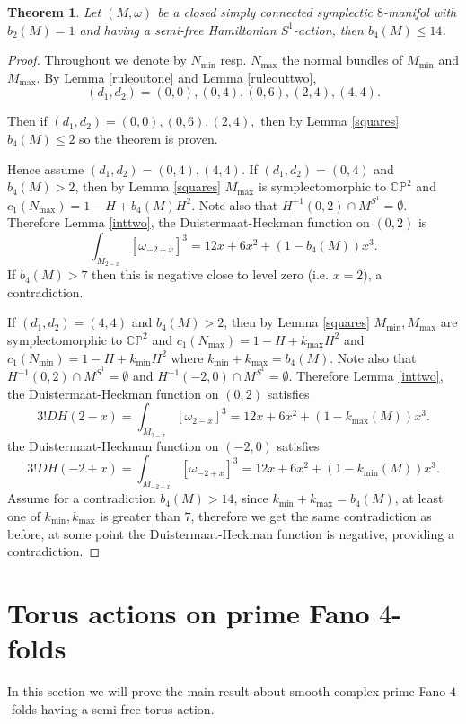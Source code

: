 \documentclass[12pt]{article}
\newtheorem{theorem}{Theorem}[section]
\begin{document}
\begin{theorem} \label{bfourbound}
Let $(M,\omega)$ be a closed  simply connected symplectic $8$-manifol with $b_{2}(M)=1$ and having a semi-free Hamiltonian $S^1$-action, then $b_{4}(M) \leq 14$.
\end{theorem}
\begin{proof}
Throughout we denote by $N_{\min}$ resp. $N_{\max}$ the normal bundles of $M_{\min}$ and $M_{\max}$. By Lemma \ref{ruleoutone} and Lemma \ref{ruleouttwo}, $$(d_1,d_2) = (0,0),(0,4),(0,6),(2,4),(4,4).$$

Then if $(d_1,d_2) =  (0,0),(0,6),(2,4),$ then by Lemma \ref{squares} $b_{4}(M) \leq 2$ so the theorem is proven.

Hence assume $(d_1,d_2) = (0,4),(4,4).$ If $(d_1,d_2) = (0,4)$ and $b_{4}(M) > 2$, then by Lemma \ref{squares} $M_{\max}$ is symplectomorphic to $\mathbb{CP}^2$ and $c_{1}(N_{\max}) = 1 -H + b_{4}(M)H^2$. Note also that $H^{-1}(0,2) \cap M^{S^1} = \emptyset$. Therefore Lemma \ref{inttwo}, the Duistermaat-Heckman function on $(0,2)$ is  $$\int_{M_{2-x}} [\omega_{-2+x}]^3 = 12x + 6x^2 +(1 -b_{4}(M))x^3.$$ If $b_{4}(M)>7$ then this is negative close to level zero (i.e. $x=2$), a contradiction.


If $(d_1,d_2) = (4,4)$ and $b_{4}(M) > 2$, then by Lemma \ref{squares} $M_{\min},M_{\max}$ are symplectomorphic to $\mathbb{CP}^2$ and $c_{1}(N_{\max}) = 1 -H + k_{\max}H^2$ and  $c_{1}(N_{\min}) = 1 -H + k_{\min}H^2$ where $k_{\min}+ k_{\max}=b_{4}(M)$. Note also that $H^{-1}(0,2) \cap M^{S^1} = \emptyset$ and  $H^{-1}(-2,0) \cap M^{S^1} = \emptyset$. Therefore Lemma \ref{inttwo}, the Duistermaat-Heckman function on $(0,2)$ satisfies  $$3!DH(2-x) = \int_{M_{2-x}} [\omega_{2-x}]^3 = 12x + 6x^2 +(1 -k_{\max}(M))x^3.$$ the Duistermaat-Heckman function on $(-2,0)$ satisfies  $$3!DH(-2+x) = \int_{M_{-2+x}} [\omega_{-2+x}]^3 = 12x + 6x^2 +(1 -k_{\min}(M))x^3.$$ Assume for a contradiction $b_{4}(M) >14$, since $k_{\min}+ k_{\max}=b_{4}(M)$, at least one of $k_{\min},k_{\max}$ is greater than $7$, therefore we get the same contradiction as before, at some point the Duistermaat-Heckman function is negative, providing a contradiction.
\end{proof}
\section{Torus actions on prime Fano $4$-folds} \label{Autfan}
In this section we will prove the main result about smooth complex prime Fano $4$-folds having a semi-free torus action. 
\end{document}
